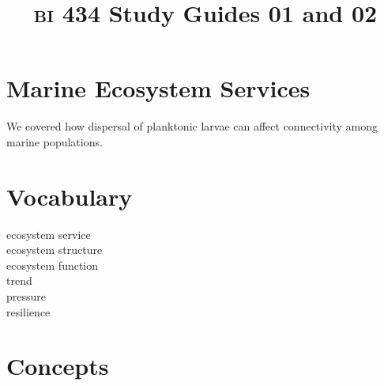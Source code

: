 \documentclass[letterpaper]{tufte-handout}
\title{{\scshape bi} 434 Study Guides 01 and 02}
\date{} %
\begin{document}
\maketitle	%

\section*{Marine Ecosystem Services}

We covered how dispersal of planktonic larvae can affect connectivity among marine populations.

\section*{Vocabulary}

\vspace{-1\baselineskip}
\begin{multicols}{2}
ecosystem service \\
ecosystem structure \\
ecosystem function \\
trend \\
pressure \\
resilience
\end{multicols}

\section*{Concepts}
\end{document}
